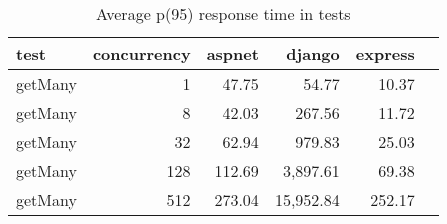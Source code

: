 \FloatBarrier
\begin{table}[!htp]\centering
    \caption{Average p(95) response time in tests}\label{tab:resultsGetMany}
    \scriptsize
    \begin{tabular}{lrrrrr}\toprule
        test    & concurrency & aspnet & django    & express \\\midrule
        getMany & 1           & 47.75  & 54.77     & 10.37   \\
        getMany & 8           & 42.03  & 267.56    & 11.72   \\
        getMany & 32          & 62.94  & 979.83    & 25.03   \\
        getMany & 128         & 112.69 & 3,897.61  & 69.38   \\
        getMany & 512         & 273.04 & 15,952.84 & 252.17  \\
        \bottomrule
    \end{tabular}
\end{table}
\FloatBarrier
